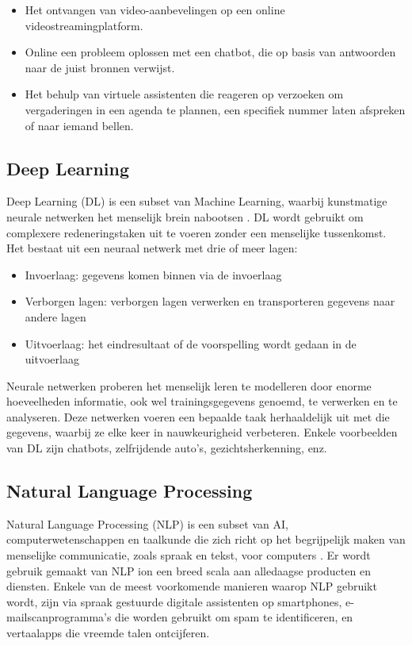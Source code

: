 \begin{itemize}
  \item Het ontvangen van video-aanbevelingen op een online videostreamingplatform.
  \item	Online een probleem oplossen met een chatbot, die op basis van antwoorden naar de juist bronnen verwijst.
  \item	Het behulp van virtuele assistenten die reageren op verzoeken om vergaderingen in een agenda te plannen, een specifiek nummer laten afspreken of naar iemand bellen.
\end{itemize}

\subsection{Deep Learning}
Deep Learning (DL) is een subset van Machine Learning, waarbij kunstmatige neurale netwerken het menselijk brein nabootsen \autocite{Coursera2024a}. DL wordt gebruikt om complexere redeneringstaken uit te voeren zonder een menselijke tussenkomst. Het bestaat uit een neuraal netwerk met drie of meer lagen: 
\begin{itemize}
  \item	Invoerlaag: gegevens komen binnen via de invoerlaag
  \item	Verborgen lagen: verborgen lagen verwerken en transporteren gegevens naar andere lagen
  \item	Uitvoerlaag: het eindresultaat of de voorspelling wordt gedaan in de uitvoerlaag
\end{itemize}
Neurale netwerken proberen het menselijk leren te modelleren door enorme hoeveelheden informatie, ook wel trainingsgegevens genoemd, te verwerken en te analyseren. Deze netwerken voeren een bepaalde taak herhaaldelijk uit met die gegevens, waarbij ze elke keer in nauwkeurigheid verbeteren. Enkele voorbeelden van DL zijn chatbots, zelfrijdende auto’s, gezichtsherkenning, enz.

\subsection{Natural Language Processing}
Natural Language Processing (NLP) is een subset van AI, computerwetenschappen en taalkunde die zich richt op het begrijpelijk maken van menselijke communicatie, zoals spraak en tekst, voor computers \autocite{Coursera2024b}. Er wordt gebruik gemaakt van NLP ion een breed scala aan alledaagse producten en diensten. Enkele van de meest voorkomende manieren waarop NLP gebruikt wordt, zijn via spraak gestuurde digitale assistenten op smartphones, e-mailscanprogramma's die worden gebruikt om spam te identificeren, en vertaalapps die vreemde talen ontcijferen.

